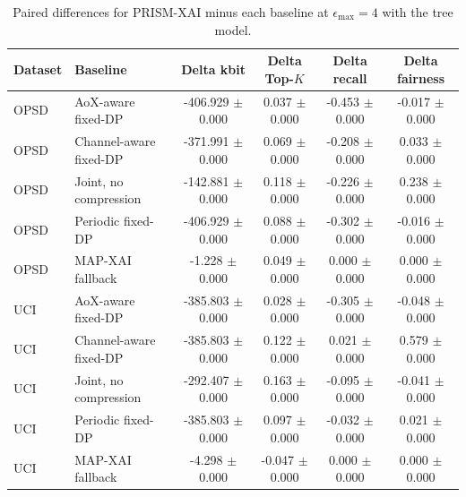 \begin{table}[t]
\caption{Paired differences for PRISM-XAI minus each baseline at $\epsilon_{\max}=4$ with the tree model.}
\label{tab:paired-differences}
\centering
\scriptsize
\setlength{\tabcolsep}{3pt}
\begin{tabular}{llcccc}
\toprule
Dataset & Baseline & Delta kbit & Delta Top-$K$ & Delta recall & Delta fairness \\
\midrule
OPSD & AoX-aware fixed-DP & -406.929 $\pm$ 0.000 & 0.037 $\pm$ 0.000 & -0.453 $\pm$ 0.000 & -0.017 $\pm$ 0.000 \\
OPSD & Channel-aware fixed-DP & -371.991 $\pm$ 0.000 & 0.069 $\pm$ 0.000 & -0.208 $\pm$ 0.000 & 0.033 $\pm$ 0.000 \\
OPSD & Joint, no compression & -142.881 $\pm$ 0.000 & 0.118 $\pm$ 0.000 & -0.226 $\pm$ 0.000 & 0.238 $\pm$ 0.000 \\
OPSD & Periodic fixed-DP & -406.929 $\pm$ 0.000 & 0.088 $\pm$ 0.000 & -0.302 $\pm$ 0.000 & -0.016 $\pm$ 0.000 \\
OPSD & MAP-XAI fallback & -1.228 $\pm$ 0.000 & 0.049 $\pm$ 0.000 & 0.000 $\pm$ 0.000 & 0.000 $\pm$ 0.000 \\
UCI & AoX-aware fixed-DP & -385.803 $\pm$ 0.000 & 0.028 $\pm$ 0.000 & -0.305 $\pm$ 0.000 & -0.048 $\pm$ 0.000 \\
UCI & Channel-aware fixed-DP & -385.803 $\pm$ 0.000 & 0.122 $\pm$ 0.000 & 0.021 $\pm$ 0.000 & 0.579 $\pm$ 0.000 \\
UCI & Joint, no compression & -292.407 $\pm$ 0.000 & 0.163 $\pm$ 0.000 & -0.095 $\pm$ 0.000 & -0.041 $\pm$ 0.000 \\
UCI & Periodic fixed-DP & -385.803 $\pm$ 0.000 & 0.097 $\pm$ 0.000 & -0.032 $\pm$ 0.000 & 0.021 $\pm$ 0.000 \\
UCI & MAP-XAI fallback & -4.298 $\pm$ 0.000 & -0.047 $\pm$ 0.000 & 0.000 $\pm$ 0.000 & 0.000 $\pm$ 0.000 \\
\bottomrule
\end{tabular}
\end{table}
